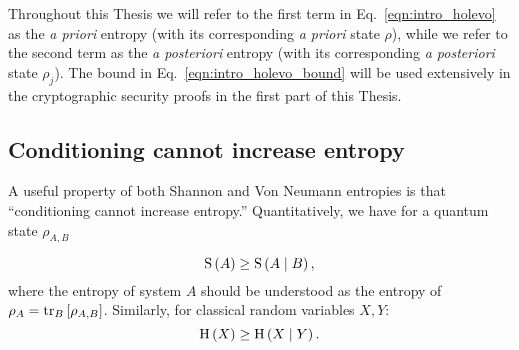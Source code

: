 Throughout this Thesis we will refer to the first term in Eq.~\ref{eqn:intro_holevo} as the \emph{a priori} entropy (with its corresponding \emph{a priori} state $\rho$), while we refer to the second term as the \emph{a  posteriori} entropy (with its corresponding \emph{a posteriori} state $\rho_j$). The bound in Eq.~\ref{eqn:intro_holevo_bound} will be used extensively in the cryptographic security proofs in the first part of this Thesis.


\FloatBarrier
\subsection{Conditioning cannot increase entropy}

A useful property of both Shannon and Von Neumann entropies is that ``conditioning cannot increase entropy.'' Quantitatively, we have for a quantum state $\rho_{A, B}$

\begin{equation}
\text{S}\left(A\right) \ge \text{S}\left( A \; \middle| \; B \right),
\end{equation}
where the entropy of system $A$ should be understood as the entropy of $\rho_A = \tr_B\left[\rho_{A, B}\right]$. Similarly, for classical random variables $X, Y$:
\begin{equation}
\text{H}\left(X\right) \ge \text{H}\left(X \; \middle| \; Y\right).
\end{equation}








